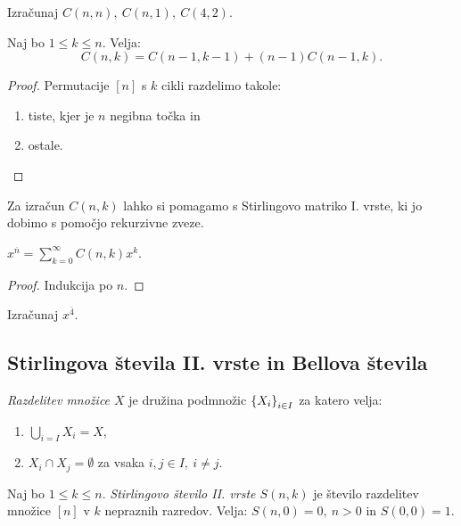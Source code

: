 \begin{primer}
    Izračunaj $C(n,n), \ C(n, 1), \ C(4,2)$.
\end{primer}

\begin{trditev}
    Naj bo $1 \leq k \leq n$. Velja:
    $$C(n, k) = C(n-1, k-1) + (n-1)C(n-1, k).$$
\end{trditev}

\begin{proof}
    Permutacije $[n]$ s $k$ cikli razdelimo takole:
    \begin{enumerate}
        \item tiste, kjer je $n$ negibna točka in
        \item ostale. \qedhere
    \end{enumerate}
\end{proof}

Za izračun $C(n,k)$ lahko si pomagamo s Stirlingovo matriko I. vrste, ki jo dobimo s pomočjo rekurzivne zveze.

\begin{trditev}
    $x^{\overline{n}} = \sum_{k=0}^{\infty}C(n,k)x^k$.
\end{trditev}

\begin{proof}
    Indukcija po $n$.
\end{proof}

\begin{primer}
    Izračunaj $x^{\overline{4}}$.
\end{primer}

\subsection{Stirlingova števila II. vrste in Bellova števila}
\begin{definicija}
    \emph{Razdelitev množice $X$} je družina podmnožic $\left\{X_i\right\}_{i \in I}$ za katero velja:
    \begin{enumerate}
        \item $\bigcup_{i=I}X_i =X$,
        \item $X_i \cap X_j = \emptyset$ za vsaka $i,j \in I, \ i \neq j$.
    \end{enumerate}
\end{definicija}

\begin{definicija}
    Naj bo $1 \leq k \leq n$. \emph{Stirlingovo število II. vrste $S(n,k)$} je število razdelitev množice $[n]$ v $k$ nepraznih razredov. Velja: $S(n, 0) = 0, \ n > 0$ in $S(0,0) = 1$.
\end{definicija}

